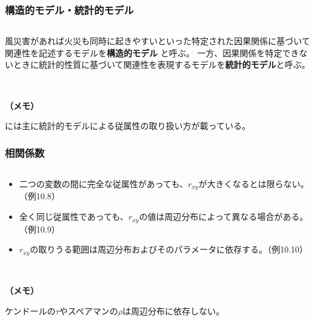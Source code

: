 \subsubsection{構造的モデル・統計的モデル}

\begin{sol}
$ $

風災害があれば火災も同時に起きやすいといった特定された因果関係に基づいて関連性を記述するモデルを\textbf{構造的モデル}
と呼ぶ。
一方、因果関係を特定できないときに統計的性質に基づいて関連性を表現するモデルを\textbf{統計的モデル}と呼ぶ。
\end{sol}


\


\textbf{（メモ）}

\cite{教科書}には主に統計的モデルによる従属性の取り扱い方が載っている。


\newpage

\subsubsection{相関係数}

\begin{sol}
$ $

\begin{itemize}
  \item 二つの変数の間に完全な従属性があっても、$r_{xy}$が大きくなるとは限らない。（\cite{教科書}例10.8）
  \item 全く同じ従属性であっても、$r_{xy}$の値は周辺分布によって異なる場合がある。（\cite{教科書}例10.9）
  \item $r_{xy}$の取りうる範囲は周辺分布およびそのパラメータに依存する。（\cite{教科書}例10.10）
\end{itemize}
\end{sol}

\


\textbf{（メモ）}

ケンドールの$\tau$やスペアマンの$\rho$は周辺分布に依存しない。


\newpage

